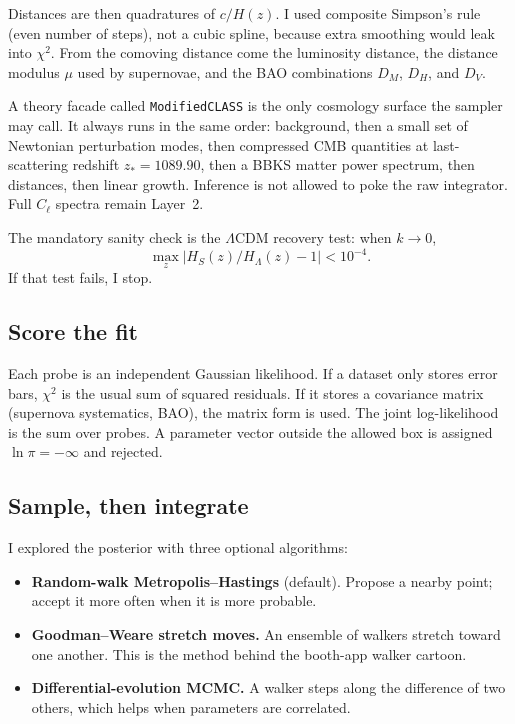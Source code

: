 \documentclass[12pt,letterpaper]{article}
\begin{document}
Distances are then quadratures of $c/H(z)$. I used composite Simpson's
rule (even number of steps), not a cubic spline, because extra
smoothing would leak into $\chi^2$. From the comoving distance come
the luminosity distance, the distance modulus $\mu$ used by supernovae,
and the BAO combinations $D_M$, $D_H$, and $D_V$.

A theory facade called \texttt{ModifiedCLASS} is the only cosmology
surface the sampler may call. It always runs in the same order:
background, then a small set of Newtonian perturbation modes, then
compressed CMB quantities at last-scattering redshift $z_*=1089.90$,
then a BBKS matter power spectrum, then distances, then linear growth.
Inference is not allowed to poke the raw integrator. Full $C_\ell$
spectra remain Layer~2.

The mandatory sanity check is the $\Lambda$CDM recovery test: when
$k\to 0$,
\begin{equation}
  \max_z \bigl|H_S(z)/H_\Lambda(z)-1\bigr| < 10^{-4}.
\end{equation}
If that test fails, I stop.

\subsection{Score the fit}

Each probe is an independent Gaussian likelihood. If a dataset only
stores error bars, $\chi^2$ is the usual sum of squared residuals. If
it stores a covariance matrix (supernova systematics, BAO), the matrix
form is used. The joint log-likelihood is the sum over probes. A
parameter vector outside the allowed box is assigned
$\ln\pi=-\infty$ and rejected.

\subsection{Sample, then integrate}

I explored the posterior with three optional algorithms:

\begin{itemize}[leftmargin=1.6em]
  \item \textbf{Random-walk Metropolis--Hastings} (default). Propose a
        nearby point; accept it more often when it is more probable.
  \item \textbf{Goodman--Weare stretch moves.} An ensemble of walkers
        stretch toward one another. This is the method behind the
        booth-app walker cartoon.
  \item \textbf{Differential-evolution MCMC.} A walker steps along the
        difference of two others, which helps when parameters are
        correlated.
\end{itemize}
\end{document}
